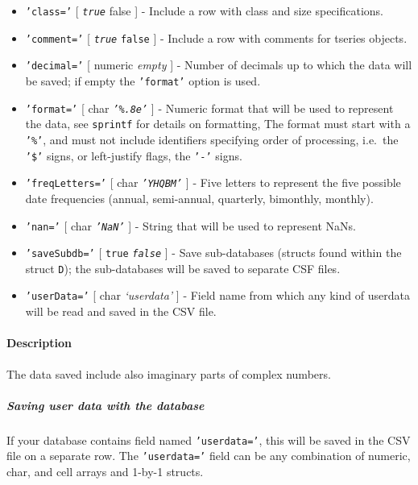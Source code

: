  \begin{itemize}
 \item
   \texttt{'class='} {[} \emph{\texttt{true}} \textbar{} false {]} -
   Include a row with class and size specifications.
 \item
   \texttt{'comment='} {[} \emph{\texttt{true}} \textbar{} \texttt{false}
   {]} - Include a row with comments for tseries objects.
 \item
   \texttt{'decimal='} {[} numeric \textbar{} \emph{empty} {]} - Number
   of decimals up to which the data will be saved; if empty the
   \texttt{'format'} option is used.
 \item
   \texttt{'format='} {[} char \textbar{} \emph{\texttt{'\%.8e'}} {]} -
   Numeric format that will be used to represent the data, see
   \texttt{sprintf} for details on formatting, The format must start with
   a \texttt{'\%'}, and must not include identifiers specifying order of
   processing, i.e.~the \texttt{'\$'} signs, or left-justify flags, the
   \texttt{'-'} signs.
 \item
   \texttt{'freqLetters='} {[} char \textbar{} \emph{\texttt{'YHQBM'}}
   {]} - Five letters to represent the five possible date frequencies
   (annual, semi-annual, quarterly, bimonthly, monthly).
 \item
   \texttt{'nan='} {[} char \textbar{} \emph{\texttt{'NaN'}} {]} - String
   that will be used to represent NaNs.
 \item
   \texttt{'saveSubdb='} {[} \texttt{true} \textbar{}
   \emph{\texttt{false}} {]} - Save sub-databases (structs found within
   the struct \texttt{D}); the sub-databases will be saved to separate
   CSF files.
 \item
   \texttt{'userData='} {[} char \textbar{} \emph{`userdata'} {]} - Field
   name from which any kind of userdata will be read and saved in the CSV
   file.
 \end{itemize}
 
 \paragraph{Description}
 
 The data saved include also imaginary parts of complex numbers.
 
 \subparagraph{Saving user data with the database}
 
 If your database contains field named \texttt{'userdata='}, this will be
 saved in the CSV file on a separate row. The \texttt{'userdata='} field
 can be any combination of numeric, char, and cell arrays and 1-by-1
 structs.
 
